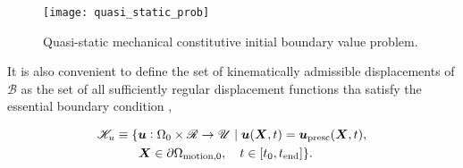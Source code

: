 \begin{figure}
  \texttt{[image: quasi\_static\_prob]}
  \caption{Quasi-static mechanical constitutive initial boundary value problem.}
\label{fig:quasi_static_prob}
\end{figure}

It is also convenient to define the set of kinematically admissible displacements of $\mathscr{B}$ as the set of all sufficiently regular displacement functions tha satisfy the essential boundary condition \citep{de_souza_neto_computational_2008},
\begin{highlight}[innertopmargin=-5pt]
    \begin{multline}
        \mathscr{K}_u\equiv \{\bm{u}:\Omega_0\times \mathscr{R}\to \mathscr{U}\;|\;\bm{u}(\bm{X},t) = \bm{u}_\text{presc} (\bm{X},t),\\ \bm{X}\in\partial \Omega_\text{motion,0},\quad t\in [t_0,t_\text{end}]\}.\quad
    \end{multline}
\end{highlight}

